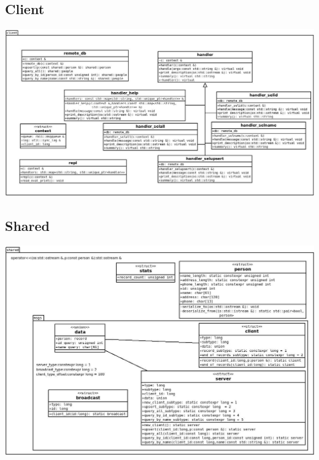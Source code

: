 \documentclass[a4paper,10pt]{article}
\begin{document}
	\clearpage
    
    \subsection{Client}
	\begin{center}
        \includegraphics[scale=0.8,angle=90]{client.png}
    \end{center}
    
    \clearpage

    \subsection{Shared}
	\begin{center}
        \includegraphics[scale=0.8]{shared.png}
    \end{center}
    
\end{document}
